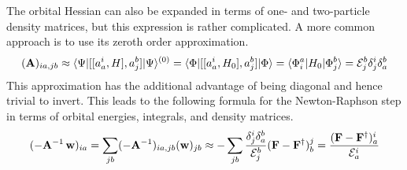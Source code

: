 \documentclass[11pt]{article}
\numberwithin{equation}{section}
\begin{document}
\begin{rmk}
The orbital Hessian can also be expanded in terms of one- and two-particle density matrices, but this expression is rather complicated.
A more common approach is to use its zeroth order approximation.
\begin{align}
  (\mathbf{A})_{ia,jb}
\approx
  \langle\Psi |[[a^i_a, H], a^b_j]|\Psi \rangle^{(0)}
=
  \langle\Phi |[[a^i_a, H_0], a^b_j]|\Phi \rangle
=
  \langle\Phi ^a_i|H_0|\Phi ^b_j\rangle
=
  \mathcal{E}_j^b
  \delta ^i_j
  \delta ^b_a
\end{align}
This approximation has the additional advantage of being diagonal and hence trivial to invert.
This leads to the following formula for the Newton-Raphson step in terms of orbital energies, integrals, and density matrices.
\begin{align}
  (-\mathbf{A}^{-1}\,\mathbf{w})_{ia}
=
  \sum_{jb}
  (-\mathbf{A}^{-1})_{ia,jb}
  (\mathbf{w})_{jb}
\approx
  -
  \sum_{jb}
  \frac {
    \delta ^i_j
    \delta ^b_a
  }{
    \mathcal{E}_j^b
  }
  (\mathbf{F} - \mathbf{F}^\dagger)_b^j
=
  \frac {(\mathbf{F} - \mathbf{F}^\dagger)_a^i}{\mathcal{E}_a^i}
\end{align}
\end{rmk}
\end{document}
